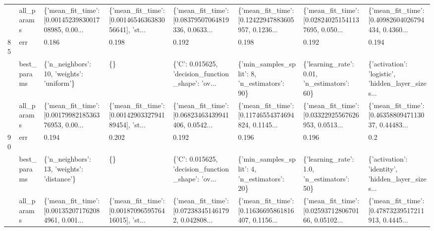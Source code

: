\begin{tabular}{llllllll}
    & all\_params &  \{'mean\_fit\_time': [0.0014523983001708985, 0.00... &  \{'mean\_fit\_time': [0.0014654636383056641], 'st... &  \{'mean\_fit\_time': [0.08379507064819336, 0.0633... &  \{'mean\_fit\_time': [0.12422947883605957, 0.1236... &  \{'mean\_fit\_time': [0.028240251541137695, 0.050... &  \{'mean\_fit\_time': [0.40982604026794434, 0.4360... \\
85  & err &                                              0.186 &                                              0.198 &                                              0.192 &                                              0.198 &                                              0.192 &                                              0.194 \\
    & best\_params &          \{'n\_neighbors': 10, 'weights': 'uniform'\} &                                                 \{\} &  \{'C': 0.015625, 'decision\_function\_shape': 'ov... &       \{'min\_samples\_split': 8, 'n\_estimators': 90\} &        \{'learning\_rate': 0.01, 'n\_estimators': 60\} &  \{'activation': 'logistic', 'hidden\_layer\_sizes... \\
    & all\_params &  \{'mean\_fit\_time': [0.0017998218536376953, 0.00... &  \{'mean\_fit\_time': [0.0014290332794189454], 'st... &  \{'mean\_fit\_time': [0.06823463439941406, 0.0542... &  \{'mean\_fit\_time': [0.11746554374694824, 0.1145... &  \{'mean\_fit\_time': [0.03322925567626953, 0.0513... &  \{'mean\_fit\_time': [0.4635880947113037, 0.44483... \\
90  & err &                                              0.194 &                                              0.202 &                                              0.192 &                                              0.196 &                                              0.196 &                                                0.2 \\
    & best\_params &         \{'n\_neighbors': 13, 'weights': 'distance'\} &                                                 \{\} &  \{'C': 0.015625, 'decision\_function\_shape': 'ov... &       \{'min\_samples\_split': 4, 'n\_estimators': 20\} &         \{'learning\_rate': 1.0, 'n\_estimators': 50\} &  \{'activation': 'identity', 'hidden\_layer\_sizes... \\
    & all\_params &  \{'mean\_fit\_time': [0.001352071762084961, 0.001... &  \{'mean\_fit\_time': [0.0018709659576416015], 'st... &  \{'mean\_fit\_time': [0.072383451461792, 0.042808... &  \{'mean\_fit\_time': [0.11636695861816407, 0.1156... &  \{'mean\_fit\_time': [0.0259371280670166, 0.05102... &  \{'mean\_fit\_time': [0.47873239517211913, 0.4445... \\

\end{tabular}
